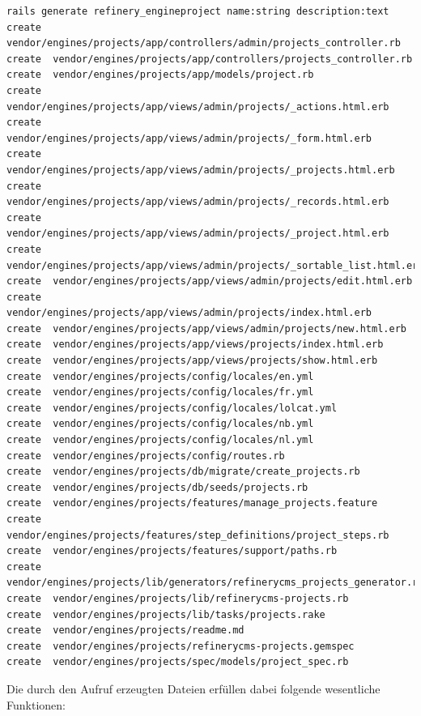 \begin{lstlisting}[label=sec.refineryoutput,caption=Aufruf des Refinery Engine Generators mit Ausgabe des erzeugten Codegerüsts]
rails generate refinery_engineproject name:string description:text
create  vendor/engines/projects/app/controllers/admin/projects_controller.rb
create  vendor/engines/projects/app/controllers/projects_controller.rb
create  vendor/engines/projects/app/models/project.rb
create  vendor/engines/projects/app/views/admin/projects/_actions.html.erb
create  vendor/engines/projects/app/views/admin/projects/_form.html.erb
create  vendor/engines/projects/app/views/admin/projects/_projects.html.erb
create  vendor/engines/projects/app/views/admin/projects/_records.html.erb
create  vendor/engines/projects/app/views/admin/projects/_project.html.erb
create  vendor/engines/projects/app/views/admin/projects/_sortable_list.html.erb
create  vendor/engines/projects/app/views/admin/projects/edit.html.erb
create  vendor/engines/projects/app/views/admin/projects/index.html.erb
create  vendor/engines/projects/app/views/admin/projects/new.html.erb
create  vendor/engines/projects/app/views/projects/index.html.erb
create  vendor/engines/projects/app/views/projects/show.html.erb
create  vendor/engines/projects/config/locales/en.yml
create  vendor/engines/projects/config/locales/fr.yml
create  vendor/engines/projects/config/locales/lolcat.yml
create  vendor/engines/projects/config/locales/nb.yml
create  vendor/engines/projects/config/locales/nl.yml
create  vendor/engines/projects/config/routes.rb
create  vendor/engines/projects/db/migrate/create_projects.rb
create  vendor/engines/projects/db/seeds/projects.rb
create  vendor/engines/projects/features/manage_projects.feature
create  vendor/engines/projects/features/step_definitions/project_steps.rb
create  vendor/engines/projects/features/support/paths.rb
create  vendor/engines/projects/lib/generators/refinerycms_projects_generator.rb
create  vendor/engines/projects/lib/refinerycms-projects.rb
create  vendor/engines/projects/lib/tasks/projects.rake
create  vendor/engines/projects/readme.md
create  vendor/engines/projects/refinerycms-projects.gemspec
create  vendor/engines/projects/spec/models/project_spec.rb
\end{lstlisting}


Die durch den Aufruf erzeugten Dateien erfüllen dabei folgende wesentliche Funktionen:

